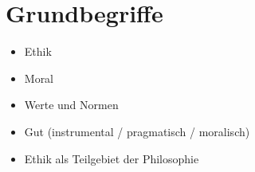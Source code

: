 
\section{Grundbegriffe}

\begin{itemize}
    \item Ethik
    \item Moral
    \item Werte und Normen
    \item Gut (instrumental / pragmatisch / moralisch)
    \item Ethik als Teilgebiet der Philosophie
\end{itemize}

